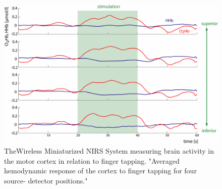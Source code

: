 \begin{figure}[htp]
\centering
\includegraphics[width=6in]{mini.png}
\caption[Wireless Miniaturized NIRS System Measuring Motor Movement]{TheWireless Miniaturized NIRS System measuring brain activity in the motor cortex in relation to finger tapping. "Averaged hemodynamic response of the cortex to finger tapping for four source-
detector positions." \cite{mini08}}
\end{figure}